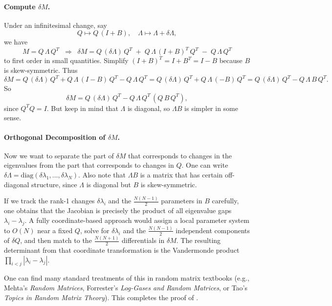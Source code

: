 \documentclass[letterpaper,11pt,oneside,reqno]{article}
\numberwithin{equation}{section}
\theoremstyle{definition}
\begin{document}
\paragraph{Compute \(\delta M\).}
Under an infinitesimal change, say
\[
  Q \mapsto Q\,(I + B),
  \quad
  \Lambda \mapsto \Lambda + \delta\Lambda,
\]
we have
\[
  M
  = Q\,\Lambda\,Q^T
  \;\;\Longrightarrow\;\;
  \delta M
  = Q\,(\delta \Lambda)\,Q^T
   \;+\;
    Q\,\Lambda\,(I+B)^T\,Q^T
   \;-\;
    Q\,\Lambda\,Q^T
\]
to first order in small quantities. Simplify \((I+B)^T = I + B^T = I - B\) because \(B\) is skew-symmetric. Thus
\[
  \delta M
  = Q\,(\delta\Lambda)\,Q^T
   + Q\,\Lambda\,(I - B)\,Q^T
   - Q\,\Lambda\,Q^T
  = Q\,(\delta\Lambda)\,Q^T
    + Q\,\Lambda\,(-B)\,Q^T
  = Q\,(\delta\Lambda)\,Q^T
    - Q\,\Lambda\,B\,Q^T.
\]
So
\[
  \delta M
  = Q\,(\delta\Lambda)\,Q^T
    - Q\,\Lambda\,Q^T \,(Q\,B\,Q^T),
\]
since \(Q^TQ=I\).  But keep in mind that \(\Lambda\) is diagonal, so \(\Lambda B\) is simpler in some sense.

\paragraph{Orthogonal Decomposition of \(\delta M\).}
Now we want to separate the part of \(\delta M\) that corresponds to changes in the eigenvalues from the part that corresponds to changes in \(Q\). One can write \(\delta\Lambda = \mathrm{diag}(\delta\lambda_1,\dots,\delta\lambda_N)\). Also note that \(\Lambda B\) is a matrix that has certain off-diagonal structure, since \(\Lambda\) is diagonal but \(B\) is skew-symmetric.

If we track the rank-1 changes \(\delta\lambda_i\) and the \(\tfrac{N(N-1)}{2}\) parameters in \(B\) carefully, one obtains that the Jacobian is precisely the product of all eigenvalue gaps \(\lambda_i-\lambda_j\). A fully coordinate-based approach would assign a local parameter system to \(O(N)\) near a fixed \(Q\), solve for \(\delta\lambda_i\) and the \(\tfrac{N(N-1)}{2}\) independent components of \(\delta Q\), and then match to the \(\tfrac{N(N+1)}{2}\) differentials in \(\delta M\). The resulting determinant from that coordinate transformation is the Vandermonde product
\(\prod_{i<j}|\lambda_i-\lambda_j|\).

One can find many standard treatments of this in random matrix textbooks (e.g., Mehta’s \emph{Random Matrices}, Forrester’s \emph{Log-Gases and Random Matrices}, or Tao’s \emph{Topics in Random Matrix Theory}). This completes the proof of .
\end{document}
